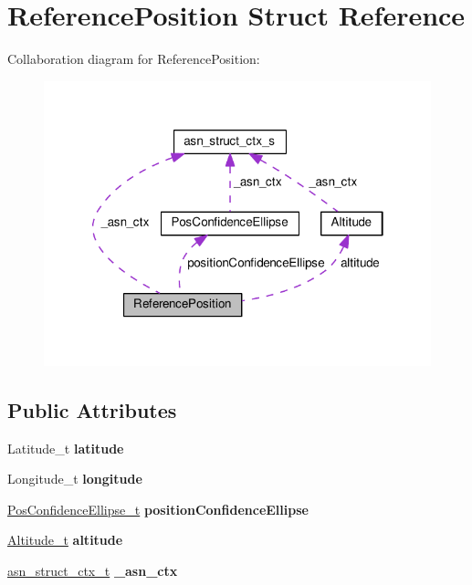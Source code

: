 \hypertarget{structReferencePosition}{}\section{Reference\+Position Struct Reference}
\label{structReferencePosition}


Collaboration diagram for Reference\+Position\+:\nopagebreak
\begin{figure}[H]
\begin{center}
\leavevmode
\includegraphics[width=318pt]{structReferencePosition__coll__graph}
\end{center}
\end{figure}
\subsection*{Public Attributes}
\begin{DoxyCompactItemize}
\item 
Latitude\+\_\+t {\bfseries latitude}\hypertarget{structReferencePosition_a56b7dd63874f605017c6f602a77b4d1f}{}\label{structReferencePosition_a56b7dd63874f605017c6f602a77b4d1f}

\item 
Longitude\+\_\+t {\bfseries longitude}\hypertarget{structReferencePosition_a1942c15d336ed146858905bfc69d64fe}{}\label{structReferencePosition_a1942c15d336ed146858905bfc69d64fe}

\item 
\hyperlink{structPosConfidenceEllipse}{Pos\+Confidence\+Ellipse\+\_\+t} {\bfseries position\+Confidence\+Ellipse}\hypertarget{structReferencePosition_a93e09c698d6cf78b6fec1376f0f135f4}{}\label{structReferencePosition_a93e09c698d6cf78b6fec1376f0f135f4}

\item 
\hyperlink{structAltitude}{Altitude\+\_\+t} {\bfseries altitude}\hypertarget{structReferencePosition_a791c911becdafe418f1aa852899d1411}{}\label{structReferencePosition_a791c911becdafe418f1aa852899d1411}

\item 
\hyperlink{structasn__struct__ctx__s}{asn\+\_\+struct\+\_\+ctx\+\_\+t} {\bfseries \+\_\+asn\+\_\+ctx}\hypertarget{structReferencePosition_a44909c19680b12315fb4d585fb43ef6b}{}\label{structReferencePosition_a44909c19680b12315fb4d585fb43ef6b}

\end{DoxyCompactItemize}


